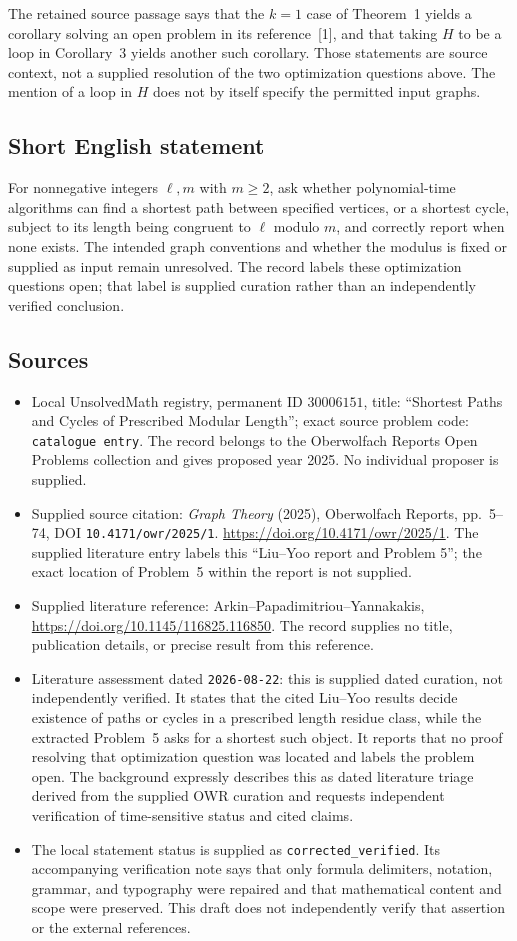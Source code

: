 \documentclass[11pt]{article}
\begin{document}
The retained source passage says that the \(k=1\) case of Theorem~1 yields a corollary solving an open problem in its reference~[1], and that taking \(H\) to be a loop in Corollary~3 yields another such corollary. Those statements are source context, not a supplied resolution of the two optimization questions above. The mention of a loop in \(H\) does not by itself specify the permitted input graphs.
\subsection{Short English statement}
For nonnegative integers \(\ell,m\) with \(m\geq2\), ask whether polynomial-time algorithms can find a shortest path between specified vertices, or a shortest cycle, subject to its length being congruent to \(\ell\) modulo \(m\), and correctly report when none exists. The intended graph conventions and whether the modulus is fixed or supplied as input remain unresolved. The record labels these optimization questions open; that label is supplied curation rather than an independently verified conclusion.
\subsection{Sources}
\begin{itemize}
\item Local UnsolvedMath registry, permanent ID \(30006151\), title: ``Shortest Paths and Cycles of Prescribed Modular Length''; exact source problem code: \texttt{catalogue entry}. The record belongs to the Oberwolfach Reports Open Problems collection and gives proposed year 2025. No individual proposer is supplied.
\item Supplied source citation: \emph{Graph Theory} (2025), Oberwolfach Reports, pp.~5--74, DOI \texttt{10.4171/owr/2025/1}. \url{https://doi.org/10.4171/owr/2025/1}. The supplied literature entry labels this ``Liu--Yoo report and Problem 5''; the exact location of Problem~5 within the report is not supplied.
\item Supplied literature reference: Arkin--Papadimitriou--Yannakakis, \url{https://doi.org/10.1145/116825.116850}. The record supplies no title, publication details, or precise result from this reference.
\item Literature assessment dated \texttt{2026-08-22}: this is supplied dated curation, not independently verified. It states that the cited Liu--Yoo results decide existence of paths or cycles in a prescribed length residue class, while the extracted Problem~5 asks for a shortest such object. It reports that no proof resolving that optimization question was located and labels the problem open. The background expressly describes this as dated literature triage derived from the supplied OWR curation and requests independent verification of time-sensitive status and cited claims.
\item The local statement status is supplied as \texttt{corrected\_verified}. Its accompanying verification note says that only formula delimiters, notation, grammar, and typography were repaired and that mathematical content and scope were preserved. This draft does not independently verify that assertion or the external references.
\end{itemize}
\end{document}
